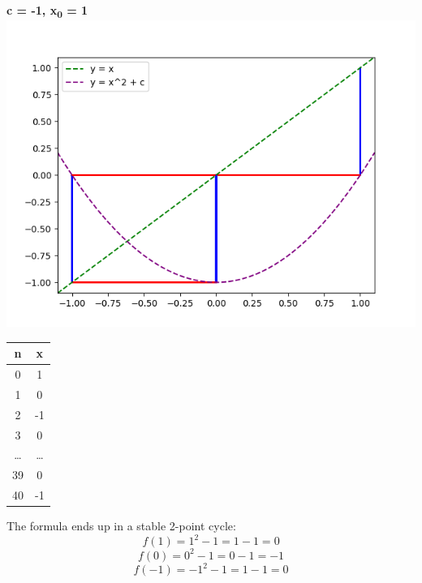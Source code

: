 \documentclass{article}
\begin{document}
\newpage
\begin{center}
    \textbf{c = -1, x\textsubscript{0} = 1}
    \includegraphics[scale=0.8]{4}
    \begin{tabular}{| c | c |}
        \hline
        n & x\\
        \hline
        0 & 1\\
        1 & 0\\
        2 & -1\\
        3 & 0\\
        \dots & \dots \\ 
        39 & 0\\
        40 &  -1\\
        \hline
    \end{tabular}
    \end{center}
The formula ends up in a stable 2-point cycle:
\[
f(1) = 1^{2} - 1 = 1 - 1 = 0 
\]
\[
f(0) = 0^{2} - 1 = 0 - 1 = -1 
\]
\[
f(-1) = -1^{2} - 1 = 1 - 1 = 0 
\]
\end{document}

